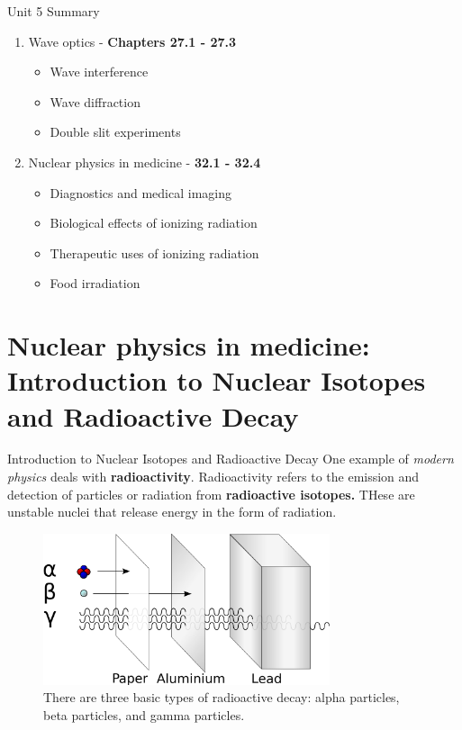 \documentclass{beamer}
\begin{document}
\begin{frame}{Unit 5 Summary}
\begin{enumerate}
\item Wave optics - \textbf{Chapters 27.1 - 27.3}
\begin{itemize}
\item Wave interference
\item Wave diffraction
\item Double slit experiments
\end{itemize}
\item Nuclear physics in medicine - \textbf{32.1 - 32.4}
\begin{itemize}
\item Diagnostics and medical imaging
\item Biological effects of ionizing radiation
\item Therapeutic uses of ionizing radiation
\item Food irradiation
\end{itemize}
\end{enumerate}
\end{frame}

\section{Nuclear physics in medicine: Introduction to Nuclear Isotopes and Radioactive Decay}

\begin{frame}{Introduction to Nuclear Isotopes and Radioactive Decay}
\footnotesize
One example of \textit{modern physics} deals with \textbf{\alert{radioactivity}}.  Radioactivity refers to the emission and detection of particles or radiation from \textbf{radioactive isotopes.}  THese are unstable nuclei that release energy in the form of radiation.
\begin{figure}
\centering
\includegraphics[width=0.75\textwidth]{figures/radioactivity.png}
\caption{\label{fig:radio5} There are three basic types of radioactive decay: alpha particles, beta particles, and gamma particles.}
\end{figure}
\end{frame}
\end{document}
